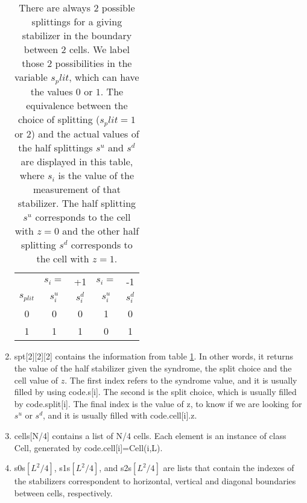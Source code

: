 \documentclass[a4paper,12pt]{article}
\begin{document}
\begin{enumerate}
\begin{table}[h]
\begin{center}
\begin{tabular}{|c|c c|c c| }
\hline
&$s_i=$&+1&$s_i=$&-1\\
$s_{plit}$&$s^u_i$&$s^d_i$&$s^u_i$&$s^d_i$\\
\hline
0&0&0&1&0\\
1&1&1&0&1\\
\hline
\end{tabular}
\label{splittable}
\caption{There are always 2 possible splittings for a giving stabilizer in the boundary between 2 cells. We label those 2 possibilities in the variable $s_plit$, which can have the values $0$ or $1$. The equivalence between the choice of splitting ($s_plit=1$ or 2) and the actual values of the half splittings $s^u$ and $s^d$ are displayed in this table, where $s_i$ is the value of the measurement of that stabilizer. The half splitting $s^u$ corresponds to the cell with $z=0$ and the other half splitting $s^d$ corresponds to the cell with $z=1$.}
\end{center}
\end{table}


\item spt[2][2][2] contains the information from table \ref{splittable}. In other words, it returns the value of the half stabilizer given the syndrome, the split choice and the cell value of $z$. The first index refers to the syndrome value, and it is usually filled by using code.s[i]. The second is the split choice, which is usually filled by code.split[i]. The final index is the value of z, to know if we are looking for $s^u$ or $s^d$, and it is usually filled with code.cell[i].z.

\item cells[N/4] contains a list of N/4 cells. Each element is an instance of class Cell, generated by code.cell[i]=Cell(i,L).

\item s0s$[L^2/4]$, s1s$[L^2/4]$, and s2s$[L^2/4]$ are lists that contain the indexes of the stabilizers correspondent to horizontal, vertical and diagonal boundaries between cells, respectively.
\end{enumerate}





%




\end{document}
